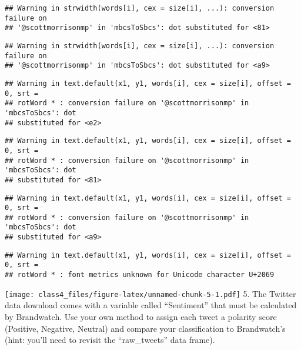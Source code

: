 \documentclass[
]{article}
\begin{document}
\begin{verbatim}
## Warning in strwidth(words[i], cex = size[i], ...): conversion failure on
## '@scottmorrisonmp⁩' in 'mbcsToSbcs': dot substituted for <81>
\end{verbatim}

\begin{verbatim}
## Warning in strwidth(words[i], cex = size[i], ...): conversion failure on
## '@scottmorrisonmp⁩' in 'mbcsToSbcs': dot substituted for <a9>
\end{verbatim}

\begin{verbatim}
## Warning in text.default(x1, y1, words[i], cex = size[i], offset = 0, srt =
## rotWord * : conversion failure on '@scottmorrisonmp⁩' in 'mbcsToSbcs': dot
## substituted for <e2>
\end{verbatim}

\begin{verbatim}
## Warning in text.default(x1, y1, words[i], cex = size[i], offset = 0, srt =
## rotWord * : conversion failure on '@scottmorrisonmp⁩' in 'mbcsToSbcs': dot
## substituted for <81>
\end{verbatim}

\begin{verbatim}
## Warning in text.default(x1, y1, words[i], cex = size[i], offset = 0, srt =
## rotWord * : conversion failure on '@scottmorrisonmp⁩' in 'mbcsToSbcs': dot
## substituted for <a9>
\end{verbatim}

\begin{verbatim}
## Warning in text.default(x1, y1, words[i], cex = size[i], offset = 0, srt =
## rotWord * : font metrics unknown for Unicode character U+2069
\end{verbatim}

\texttt{[image: class4\_files/figure-latex/unnamed-chunk-5-1.pdf]} 5. The
Twitter data download comes with a variable called ``Sentiment'' that
must be calculated by Brandwatch. Use your own method to assign each
tweet a polarity score (Positive, Negative, Neutral) and compare your
classification to Brandwatch's (hint: you'll need to revisit the
``raw\_tweets'' data frame).
\end{document}
